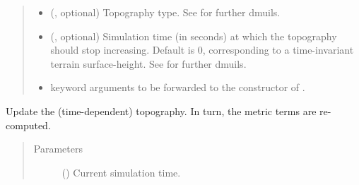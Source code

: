 \documentclass[letterpaper,10pt,english]{sphinxmanual}
\begin{document}
\begin{fulllineitems}
\begin{fulllineitems}
\begin{quote}
\begin{description}
\begin{itemize}
\item {} 
 (, optional) \textendash{} Topography type. See {\hyperref[\detokenize{api:module-grids.topography}]{}}
for further dmuils.

\item {} 
 (, optional) \textendash{} Simulation time (in seconds) at which the topography
should stop increasing. Default is 0, corresponding to a time-invariant terrain
surface-height. See {\hyperref[\detokenize{api:module-grids.topography}]{}} for further dmuils.

\item {} 
 \textendash{} keyword arguments to be forwarded to the constructor of
{\hyperref[\detokenize{api:grids.topography.Topography2d}]{}}.

\end{itemize}

\end{description}\end{quote}

\end{fulllineitems}


\begin{fulllineitems}
\label{\detokenize{api:grids.gal_chen.GalChen3d.update_topography}}
Update the (time-dependent) topography. In turn, the metric terms are re-computed.
\begin{quote}\begin{description}
\item[{Parameters}] \leavevmode
{} () \textendash{} Current simulation time.

\end{description}\end{quote}

\end{fulllineitems}


\end{fulllineitems}

\end{document}
